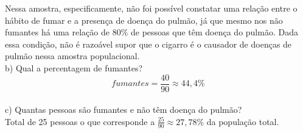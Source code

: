 Nessa amostra, especificamente, não foi possível constatar uma relação entre o hábito de fumar e a presença de doença do pulmão, já que mesmo nos não fumantes há uma relação de $80\%$ de pessoas que têm doença do pulmão. Dada essa condição, não é razoável supor que o cigarro é o causador de doenças de pulmão nessa amostra populacional.\\

b) Qual a percentagem de fumantes?
\\

\[
    fumantes = \frac{40}{90} \approx 44,4 \%
\]
\\

c) Quantas pessoas são fumantes e não têm doença do pulmão?
\\

Total de 25 pessoas o que corresponde a $\frac{25}{90} \approx 27,78\% $ da população total.
\\



